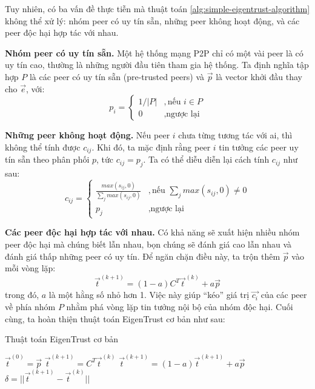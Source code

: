 Tuy nhiên, có ba vấn đề thực tiễn mà thuật toán \ref{alg:simple-eigentrust-algorithm} không thể xử lý: nhóm peer có uy tín sẵn, những peer không hoạt động, và các peer độc hại hợp tác với nhau.

\textbf{Nhóm peer có uy tín sẵn.} Một hệ thống mạng P2P chỉ có một vài peer là có uy tín cao, thường là những người đầu tiên tham gia hệ thống.
Ta định nghĩa tập hợp $P$ là các peer có uy tín sẵn (pre-trusted peers) và $\vec{p}$ là vector khởi đầu thay cho $\vec{e}$, với:
\[
  p_i =
  \begin{cases}
    1/|P| & ,\text{nếu } i \in P \\
    0     & ,\text{ngược lại}
  \end{cases}
\]

\textbf{Những peer không hoạt động.} Nếu peer $i$ chưa từng tương tác với ai, thì không thể tính được $c_{ij}$.
Khi đó, ta mặc định rằng peer $i$ tin tưởng các peer uy tín sẵn theo phân phối $p$, tức $c_{ij} = p_j$. Ta có thể diễu diễn lại cách tính $c_{ij}$ như sau:
\[
  c_{ij} =
  \begin{cases}
    \frac{max(s_{ij}, 0)}{\sum_{j} max(s_{ij}, 0)} & , \text{nếu } \sum_{j} max(s_{ij}, 0) \neq 0 \\
    p_j                                            & , \text{ngược lại}
  \end{cases}
\]

\textbf{Các peer độc hại hợp tác với nhau.} Có khả năng sẽ xuất hiện nhiều nhóm peer độc hại mà chúng biết lẫn nhau, bọn chúng sẽ đánh giá cao lẫn nhau và đánh giá thấp những peer có uy tín.
Để ngăn chặn điều này, ta trộn thêm $\vec{p}$ vào mỗi vòng lặp:
\[\vec{t}^{(k+1)} = (1 - a)C^{T}\vec{t}^{(k)} + a\vec{p}\]
trong đó, $a$ là một hằng số nhỏ hơn 1. Việc này giúp ``kéo'' giá trị $\vec{c_i}$ của các peer về phía nhóm $P$ nhằm phá vòng lặp tin tưởng nội bộ của nhóm độc hại. Cuối cùng, ta hoàn thiện thuật toán EigenTrust cơ bản như sau:

\begin{algorithm}
  \caption{Thuật toán EigenTrust cơ bản}
  \label{alg:basic-eigentrust-algorithm}
  \begin{algorithmic}
    \small
    \State $\vec{t}^{(0)} = \vec{p}$
    \Repeat
    \State $\vec{t}^{(k+1)} = C^{T}\vec{t}^{(k)}$
    \State $\vec{t}^{(k+1)} = (1 - a)\vec{t}^{(k+1)} + a\vec{p}$
    \State $\delta = || \vec{t}^{(k+1)} - \vec{t}^{(k)} ||$
    \Until{$\delta < \epsilon$}
  \end{algorithmic}
\end{algorithm}

